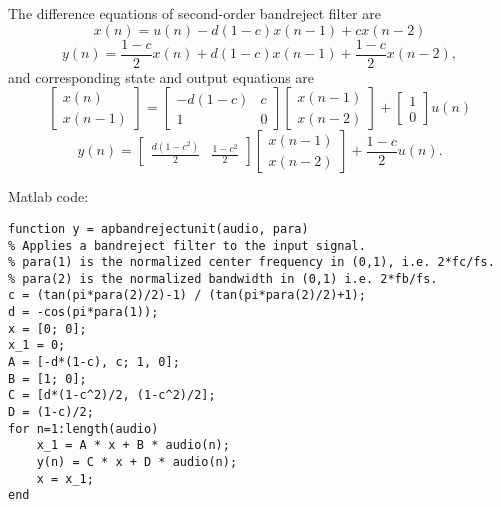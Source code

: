 \documentclass[10pt,a4paper,oneside]{beamer}
\begin{document}
\begin{frame}
The difference equations of second-order bandreject filter are
\[
x(n) = u(n) - d(1-c)x(n-1) + cx(n-2)
\]
\[
y(n) = \frac{1-c}{2}x(n) + d(1-c)x(n-1) + \frac{1-c}{2}x(n-2),
\]
and corresponding state and output equations are
\[
\begin{bmatrix}x(n)\\x(n-1)\end{bmatrix} = \begin{bmatrix}
-d(1-c)&c\\
1&0
\end{bmatrix}
\begin{bmatrix}x(n-1)\\x(n-2)\end{bmatrix} + \begin{bmatrix}1\\0\end{bmatrix}
u(n)\]
\[
y(n) = \begin{bmatrix}\frac{d(1-c^2)}{2}&\frac{1-c^2}{2}\end{bmatrix}
\begin{bmatrix}x(n-1)\\x(n-2)\end{bmatrix} + \frac{1-c}{2}u(n).
\]
\end{frame}
\begin{frame}[fragile]
Matlab code:
\begin{lstlisting}
function y = apbandrejectunit(audio, para)
% Applies a bandreject filter to the input signal.
% para(1) is the normalized center frequency in (0,1), i.e. 2*fc/fs.
% para(2) is the normalized bandwidth in (0,1) i.e. 2*fb/fs.
c = (tan(pi*para(2)/2)-1) / (tan(pi*para(2)/2)+1);
d = -cos(pi*para(1));
x = [0; 0];
x_1 = 0;
A = [-d*(1-c), c; 1, 0];
B = [1; 0];
C = [d*(1-c^2)/2, (1-c^2)/2];
D = (1-c)/2;
for n=1:length(audio)
    x_1 = A * x + B * audio(n);
    y(n) = C * x + D * audio(n);
    x = x_1;
end
\end{lstlisting}
\end{frame}
\end{document}
